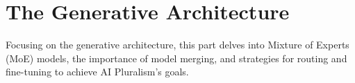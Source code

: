 \section{The Generative Architecture}
Focusing on the generative architecture, this part delves into Mixture of Experts (MoE) models, the importance of model merging, and strategies for routing and fine-tuning to achieve AI Pluralism's goals.
